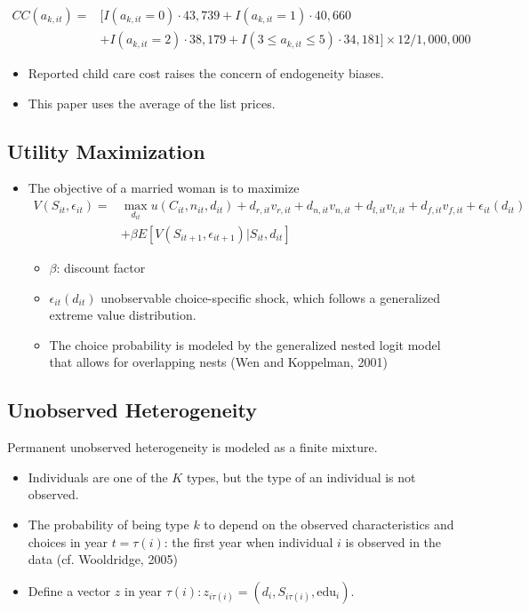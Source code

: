 \documentclass[../root]{subfiles}
\begin{document}
    \begin{align*}
      CC(a_{k, it}) = & [I(a_{k, it} = 0) \cdot 43,739 + I(a_{k, it} = 1) \cdot 40,660 \\
      &+ I(a_{k, it} = 2) \cdot 38,179 + I(3 \leq a_{k, it} \leq 5) \cdot 34,181] \times 12/1,000,000
    \end{align*}

    \begin{itemize}
      \item Reported child care cost raises the concern of endogeneity biases.
      \item This paper uses the average of the list prices.
    \end{itemize}


    \subsection{Utility Maximization}

    \begin{itemize}
      \item The objective of a married woman is to maximize
      \begin{align*}
        V(S_{it}, \epsilon_{it}) = & \max_{d_{it}} u(C_{it}, n_{it}, d_{it}) + d_{r, it} v_{r, it} + d_{n, it} v_{n, it} + d_{l, it} v_{l, it} + d_{f, it} v_{f, it} + \epsilon_{it}(d_{it}) \\
        &+ \beta E[V(S_{it+1}, \epsilon_{it+1}) | S_{it}, d_{it}]
      \end{align*}
      \begin{itemize}
        \item $\beta$: discount factor
        \item $\epsilon_{it}(d_{it})$ unobservable choice-specific shock, which follows a generalized extreme value distribution.
        \item The choice probability is modeled by the generalized nested logit model that allows for overlapping nests (Wen and Koppelman, 2001)
      \end{itemize}
    \end{itemize}

    \subsection{Unobserved Heterogeneity}

    Permanent unobserved heterogeneity is modeled as a finite mixture.

    \begin{itemize}
      \item Individuals are one of the $K$ types, but the type of an individual is not observed.
      \item The probability of being type $k$ to depend on the observed characteristics and choices in year $t = \tau(i)$: the first year when individual $i$ is observed in the data (cf. Wooldridge, 2005)
      \item Define a vector $z$ in year $\tau(i): z_{i \tau (i)} = (d_{i}, S_{i \tau (i)}, \text{edu}_i)$.
    \end{itemize}
\end{document}
